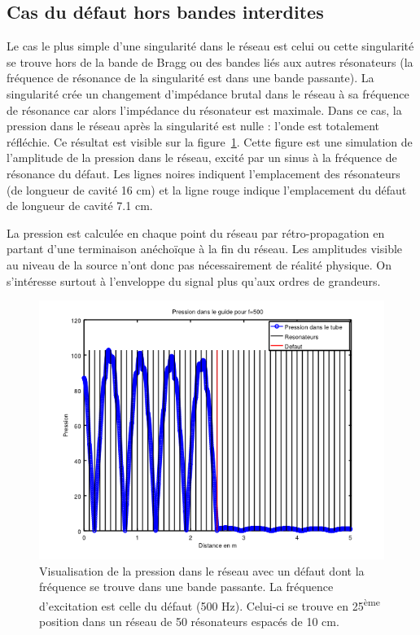 \subsection{Cas du défaut hors bandes interdites}

Le cas le plus simple d'une singularité dans le réseau est celui ou cette singularité se trouve hors de la bande de Bragg ou des bandes liés aux autres résonateurs (la fréquence de résonance de la singularité est dans une bande passante). La singularité crée un changement d'impédance brutal dans le réseau à sa fréquence de résonance car alors l'impédance du résonateur est maximale. Dans ce cas, la pression dans le réseau après la singularité est nulle : l'onde est totalement réfléchie. Ce résultat est visible sur la figure~\ref{defaut_hb}. Cette figure est une simulation de l'amplitude de la pression dans le réseau, excité par un sinus à la fréquence de résonance du défaut.	Les lignes noires indiquent l'emplacement des résonateurs (de longueur de cavité 16 cm) et la ligne rouge indique l'emplacement du défaut de longueur de cavité 7.1 cm.

La pression est calculée en chaque point du réseau par rétro-propagation en partant d'une terminaison anéchoïque à la fin du réseau. Les amplitudes visible au niveau de la source n'ont donc pas nécessairement de réalité physique. On s'intéresse surtout à l'enveloppe du signal plus qu'aux ordres de grandeurs.


\begin{figure}[!h]
\centering
\includegraphics[scale=0.5]{images_chp2/horsbande_50RH_500Hz_71mm.png}
\caption{\label{defaut_hb} Visualisation de la pression dans le réseau avec un défaut dont la fréquence se trouve dans une bande passante. La fréquence d'excitation est celle du défaut (500 Hz). Celui-ci se trouve en 25\textsuperscript{ème} position dans un réseau de 50 résonateurs espacés de 10 cm.}
\end{figure}

